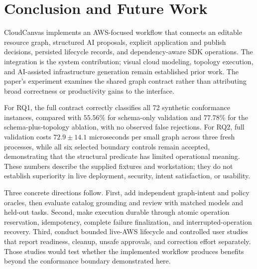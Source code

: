 \section{Conclusion and Future Work}
CloudCanvas implements an AWS-focused workflow that connects an editable resource graph, structured AI proposals, explicit application and publish decisions, persisted lifecycle records, and dependency-aware SDK operations. The integration is the system contribution; visual cloud modeling, topology execution, and AI-assisted infrastructure generation remain established prior work. The paper's experiment examines the shared graph contract rather than attributing broad correctness or productivity gains to the interface.

For RQ1, the full contract correctly classifies all 72 synthetic conformance instances, compared with $55.56\%$ for schema-only validation and $77.78\%$ for the schema-plus-topology ablation, with no observed false rejections. For RQ2, full validation costs $72.9\pm14.1$ microseconds per small graph across three fresh processes, while all six selected boundary controls remain accepted, demonstrating that the structural predicate has limited operational meaning. These numbers describe the supplied fixtures and workstation; they do not establish superiority in live deployment, security, intent satisfaction, or usability.

Three concrete directions follow. First, add independent graph-intent and policy oracles, then evaluate catalog grounding and review with matched models and held-out tasks. Second, make execution durable through atomic operation reservation, idempotency, complete failure finalization, and interrupted-operation recovery. Third, conduct bounded live-AWS lifecycle and controlled user studies that report readiness, cleanup, unsafe approvals, and correction effort separately. Those studies would test whether the implemented workflow produces benefits beyond the conformance boundary demonstrated here.
